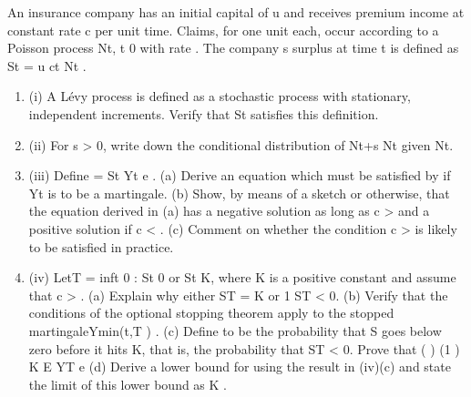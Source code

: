 \documentclass[a4paper,12pt]{article}
\begin{document}
\item An insurance company has an initial capital of u and receives premium income at constant rate c per unit time. Claims, for one unit each, occur according to a Poisson process {Nt, t 0} with rate . The company s surplus at time t is defined as
St = u ct Nt .

\begin{enumerate}
\item (i) A Lévy process is defined as a stochastic process with stationary, independent
increments. Verify that St satisfies this definition. 
\item (ii) For s > 0, write down the conditional distribution of Nt+s Nt given Nt. 
\item (iii) Define = St
Yt e .
(a) Derive an equation which must be satisfied by if Yt is to be a
martingale.
(b) Show, by means of a sketch or otherwise, that the equation derived in (a) has a negative solution as long as c > and a positive solution
if c < .
(c) Comment on whether the condition c > is likely to be satisfied in practice. 
\item (iv) LetT = inf{t 0 : St 0 or St K}, where K is a positive constant and assume that c > .
(a) Explain why either ST = K or 1 ST < 0.
(b) Verify that the conditions of the optional stopping theorem apply to the stopped martingaleYmin(t,T ) .
(c) Define to be the probability that S goes below zero before it hits K,
that is, the probability that ST < 0. Prove that
( ) (1 ) K
E YT e
(d) Derive a lower bound for using the result in (iv)(c) and state the
limit of this lower bound as K .
\end{enumerate}
\end{document}
